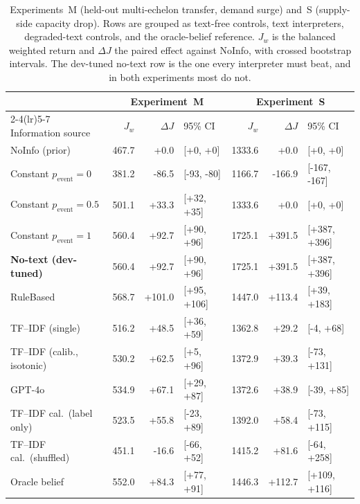 \begin{table}[t]
\caption{Experiments~M (held-out multi-echelon transfer, demand surge) and~S
(supply-side capacity drop). Rows are grouped as text-free controls, text
interpreters, degraded-text controls, and the oracle-belief reference. $J_w$ is
the balanced weighted return and $\Delta J$ the paired effect against NoInfo,
with crossed bootstrap intervals. The dev-tuned no-text row is the one every
interpreter must beat, and in both experiments most do not.}
\label{tab:transfers}
\centering\footnotesize\setlength{\tabcolsep}{2.5pt}
\begin{tabular}{@{}l rrl rrl@{}}
\toprule
 & \multicolumn{3}{c}{Experiment~M} & \multicolumn{3}{c}{Experiment~S} \\
\cmidrule(lr){2-4}\cmidrule(lr){5-7}
Information source & $J_w$ & $\Delta J$ & 95\% CI & $J_w$ & $\Delta J$ & 95\% CI \\
\midrule
NoInfo (prior) & 467.7 & +0.0 & [+0, +0] & 1333.6 & +0.0 & [+0, +0] \\
Constant $p_{\mathrm{event}}=0$ & 381.2 & -86.5 & [-93, -80] & 1166.7 & -166.9 & [-167, -167] \\
Constant $p_{\mathrm{event}}=0.5$ & 501.1 & +33.3 & [+32, +35] & 1333.6 & +0.0 & [+0, +0] \\
Constant $p_{\mathrm{event}}=1$ & 560.4 & +92.7 & [+90, +96] & 1725.1 & +391.5 & [+387, +396] \\
\textbf{No-text (dev-tuned)} & 560.4 & +92.7 & [+90, +96] & 1725.1 & +391.5 & [+387, +396] \\
\midrule
RuleBased & 568.7 & +101.0 & [+95, +106] & 1447.0 & +113.4 & [+39, +183] \\
TF--IDF (single) & 516.2 & +48.5 & [+36, +59] & 1362.8 & +29.2 & [-4, +68] \\
TF--IDF (calib., isotonic) & 530.2 & +62.5 & [+5, +96] & 1372.9 & +39.3 & [-73, +131] \\
GPT-4o & 534.9 & +67.1 & [+29, +87] & 1372.6 & +38.9 & [-39, +85] \\
\midrule
TF--IDF cal.\ (label only) & 523.5 & +55.8 & [-23, +89] & 1392.0 & +58.4 & [-73, +115] \\
TF--IDF cal.\ (shuffled) & 451.1 & -16.6 & [-66, +52] & 1415.2 & +81.6 & [-64, +258] \\
Oracle belief & 552.0 & +84.3 & [+77, +91] & 1446.3 & +112.7 & [+109, +116] \\
\bottomrule
\end{tabular}
\end{table}

